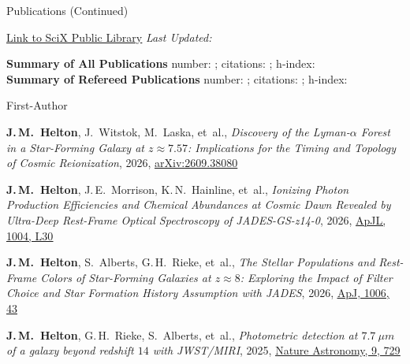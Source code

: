 \documentclass{JMH_CV}
\begin{document}

\newpage

\begin{rSection}{Publications (Continued)}

\href{https://scixplorer.org/public-libraries/57nm1ouuTMusp62fvjiXYg}{\ul{Link to SciX Public Library}} \hfill \textit{Last Updated: \DateOfLastUpdate}

\textbf{Summary of All Publications} \hfill number: \TotalCitationNumber; citations: \TotalCitationCount; h-index: \TotalIndexH \\
\textbf{Summary of Refereed Publications} \hfill number: \RefereedCitationNumber; citations: \RefereedCitationCount; h-index: \RefereedIndexH


\begin{rSubsection}{First-Author}{}{}{}
\begin{etaremune}

    \item \textbf{J.\,M.~Helton}, J.~Witstok, M.~Laska, et~al., \textit{Discovery of the Lyman-$\mathit{\alpha}$ Forest in a Star-Forming Galaxy at $\mathit{z \approx 7.57}$: Implications for the Timing and Topology of Cosmic Reionization}, 2026, \href{https://www.scixplorer.org/abs/2026arXiv260938080H/abstract}{\ul{arXiv:2609.38080}}
    
    \item \textbf{J.\,M.~Helton}, J.\,E.~Morrison, K.\,N.~Hainline, et~al., \textit{Ionizing Photon Production \mbox{Efficiencies} and Chemical Abundances at Cosmic Dawn Revealed by Ultra-Deep Rest-Frame \mbox{Optical} Spectroscopy of JADES-GS-z14-0}, 2026, \href{https://www.scixplorer.org/abs/2026ApJ..1004L..30H/abstract}{\ul{ApJL, 1004, L30}}
    
    \item \textbf{J.\,M.~Helton}, S.~Alberts, G.\,H.~Rieke, et~al., \textit{The Stellar Populations and Rest-Frame Colors of Star-Forming Galaxies at $\mathit{z \approx 8}$: Exploring the Impact of Filter Choice and Star Formation History Assumption with JADES}, 2026, \href{https://www.scixplorer.org/abs/2026ApJ..1006...43H/abstract}{\ul{ApJ, 1006, 43}}

    \item \textbf{J.\,M.~Helton}, G.\,H.~Rieke, S.~Alberts, et~al., \textit{Photometric detection at $\mathit{7.7\ \mu\mathit{m}}$ of a galaxy beyond redshift $\mathit{14}$ with JWST/MIRI}, 2025, \href{https://www.scixplorer.org/abs/2025NatAs...9..729H/abstract}{\ul{Nature Astronomy, 9, 729}}
    

\end{etaremune}
\end{rSubsection}
\end{rSection}
\end{document}
